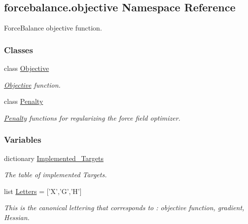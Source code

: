 \hypertarget{namespaceforcebalance_1_1objective}{\subsection{forcebalance.\-objective Namespace Reference}
\label{namespaceforcebalance_1_1objective}
}


Force\-Balance objective function.  


\subsubsection*{Classes}
\begin{DoxyCompactItemize}
\item 
class \hyperlink{classforcebalance_1_1objective_1_1Objective}{Objective}
\begin{DoxyCompactList}\small\item\em \hyperlink{classforcebalance_1_1objective_1_1Objective}{Objective} function. \end{DoxyCompactList}\item 
class \hyperlink{classforcebalance_1_1objective_1_1Penalty}{Penalty}
\begin{DoxyCompactList}\small\item\em \hyperlink{classforcebalance_1_1objective_1_1Penalty}{Penalty} functions for regularizing the force field optimizer. \end{DoxyCompactList}\end{DoxyCompactItemize}
\subsubsection*{Variables}
\begin{DoxyCompactItemize}
\item 
dictionary \hyperlink{namespaceforcebalance_1_1objective_a8c93e21f995ed17addb493ec94368ab5}{Implemented\-\_\-\-Targets}
\begin{DoxyCompactList}\small\item\em The table of implemented Targets. \end{DoxyCompactList}\item 
list \hyperlink{namespaceforcebalance_1_1objective_a89a971322532b36852765b2680651f1f}{Letters} = \mbox{[}'X','G','H'\mbox{]}
\begin{DoxyCompactList}\small\item\em This is the canonical lettering that corresponds to \-: objective function, gradient, Hessian. \end{DoxyCompactList}\end{DoxyCompactItemize}


